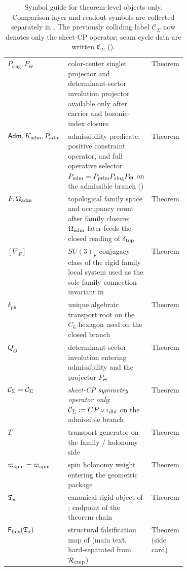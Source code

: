 \begin{table}[p]
\begin{tabularx}{\linewidth}{@{}>{\raggedright\arraybackslash}p{0.23\linewidth}Y>{\raggedright\arraybackslash}p{0.18\linewidth}@{}}
$P_{\mathrm{sing}},P_\Theta$ & color-center singlet projector and determinant-sector involution projector available only after carrier and bosonic-index closure & Theorem \\
$\mathsf{Adm},K_{\mathrm{adm}},P_{\mathrm{adm}}$ & admissibility predicate, positive constraint operator, and full operative selector $P_{\mathrm{adm}}=P_{\mathrm{prim}} P_{\mathrm{sing}}P_\Theta$ on the admissible branch () & Theorem \\
$F,\Omega_{\mathrm{adm}}$ & topological family space and occupancy count after family closure; $\Omega_{\mathrm{adm}}$ later feeds the closed reading of $\delta_{\mathrm{top}}$ & Theorem \\
$[\nabla_F]$ & $SU(3)_F$ conjugacy class of the rigid family local system used as the sole family-connection invariant in  & Theorem \\
$\delta_{\mathrm{ph}}$ & unique algebraic transport root on the $C_6$ hexagon used on the closed branch & Theorem \\
$Q_\Theta$ & determinant-sector involution entering admissibility and the projector $P_\Theta$ & Theorem \\
$\mathcal C_{\Sigma}=\mathcal C_\Sigma$ & \emph{sheet-CP symmetry operator only}: $\mathcal C_{\Sigma}:=CP\circ\tau_{\mathrm{dbl}}$ on the admissible branch & Theorem \\
$T$ & transport generator on the family / holonomy side & Theorem \\
$\varpi_{\mathrm{spin}}=\varpi_{\mathrm{spin}}$ & spin holonomy weight entering the geometric package & Theorem \\
$\mathfrak T_{\star}$ & canonical rigid object of ; endpoint of the theorem chain & Theorem \\
$\mathsf F_{\mathrm{fals}}(\mathfrak T_{\star})$ & structural falsification map of  (main text, hard-separated from $\mathcal R_{\mathrm{cmp}}$) & Theorem (side card) \\
\bottomrule
\end{tabularx}
\caption{Symbol guide for theorem-level objects only. Comparison-layer and readout symbols are
collected separately in . The previously colliding label
$\mathcal C_\Sigma$ now denotes only the sheet-CP operator; seam cycle data are written
$\mathfrak C_\Sigma$ ().}
\label{tab:symbol-guide-theorem}
\label{tab:symbol-guide}
\end{table}

